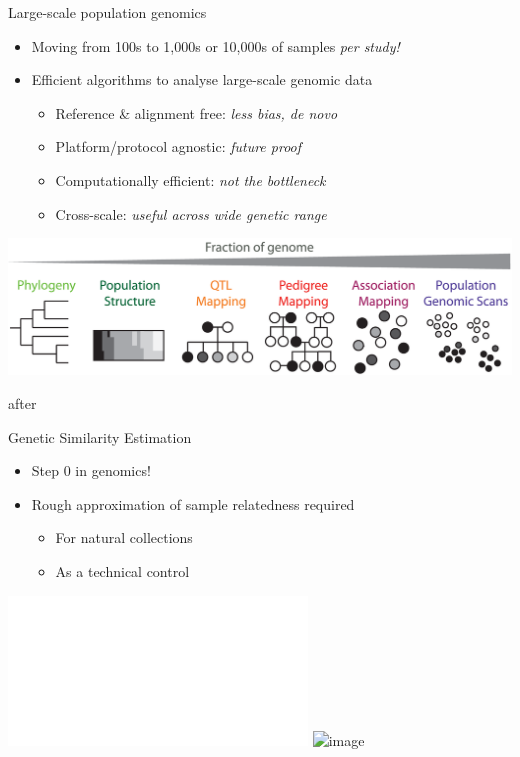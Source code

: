 \documentclass[t]{beamer}
\begin{document}
\begin{frame}{Large-scale population genomics}
  \begin{itemize}
    \item Moving from 100s to 1,000s or 10,000s of samples \emph{per study!}
    \item Efficient algorithms to analyse large-scale genomic data
    \begin{itemize}
      \item Reference \& alignment free: \textit{less bias, de novo}
      \item Platform/protocol agnostic: \textit{future proof}
      \item Computationally efficient: \textit{not the bottleneck}
      \item Cross-scale: \textit{useful across wide genetic range}
    \end{itemize}
  \end{itemize}
  \begin{center}
    \includegraphics[width=\textwidth]{img/cross-scale.png}
  \end{center}
  \tiny{after \textcite{peterson_double_2012}}
\end{frame}

\begin{frame}{Genetic Similarity Estimation}
  \begin{itemize}
    \item Step 0 in genomics!
    \item Rough approximation of sample relatedness required
      \begin{itemize}
        \item<1> For natural collections
        \item<2> As a technical control
      \end{itemize}
  \end{itemize}
  \begin{center}
    \includegraphics<1>[width=\textwidth]{img/jared-tree.pdf}
    \includegraphics<2>[width=0.6\textwidth]{img/at80-tree.png}
  \end{center}
\end{frame}
\end{document}
